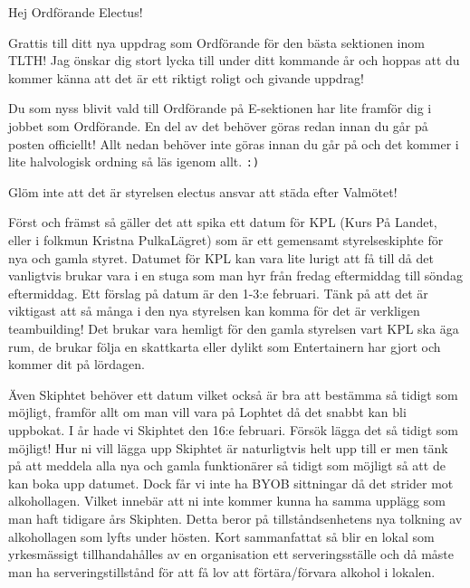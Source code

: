 \documentclass[10pt]{article}
\begin{document}
    \heading{\doctitle}
    
    Hej Ordförande Electus!
    
    Grattis till ditt nya uppdrag som Ordförande för den bästa sektionen inom TLTH! Jag önskar dig stort lycka till under ditt kommande år och hoppas att du kommer känna att det är ett riktigt roligt och givande uppdrag!
    
    Du som nyss blivit vald till Ordförande på E-sektionen har lite framför dig i jobbet som Ordförande. En del av det behöver göras redan innan du går på posten officiellt! Allt nedan behöver inte göras innan du går på och det kommer i lite halvologisk ordning så läs igenom allt. \texttt{:)}
    
    \begin{numplist}
    \item Glöm inte att det är styrelsen electus ansvar att städa efter Valmötet!
    
    \item Först och främst så gäller det att spika ett datum för KPL (Kurs På Landet, eller i folkmun Kristna PulkaLägret) som är ett gemensamt styrelseskiphte för nya och gamla styret. Datumet för KPL kan vara lite lurigt att få till då det vanligtvis brukar vara i en stuga som man hyr från fredag eftermiddag till söndag eftermiddag. Ett förslag på datum är den 1-3:e februari. Tänk på att det är viktigast att så många i den nya styrelsen kan komma för det är verkligen teambuilding! Det brukar vara hemligt för den gamla styrelsen vart KPL ska äga rum, de brukar följa en skattkarta eller dylikt som Entertainern har gjort och kommer dit på lördagen.
    
    \item Även Skiphtet behöver ett datum vilket också är bra att bestämma så tidigt som möjligt, framför allt om man vill vara på Lophtet då det snabbt kan bli uppbokat. I år hade vi Skiphtet den 16:e februari. Försök lägga det så tidigt som möjligt! Hur ni vill lägga upp Skiphtet är naturligtvis helt upp till er men tänk på att meddela alla nya och gamla funktionärer så tidigt som möjligt så att de kan boka upp datumet. Dock får vi inte ha BYOB sittningar då det strider mot alkohollagen. Vilket innebär att ni inte kommer kunna ha samma upplägg som man haft tidigare års Skiphten. Detta beror på tillståndsenhetens nya tolkning av alkohollagen som lyfts under hösten. Kort sammanfattat så blir en lokal som yrkesmässigt tillhandahålles av en organisation ett serveringsställe och då måste man ha serveringstillstånd för att få lov att förtära/förvara alkohol i lokalen.
    

\end{numplist}
\end{document}
